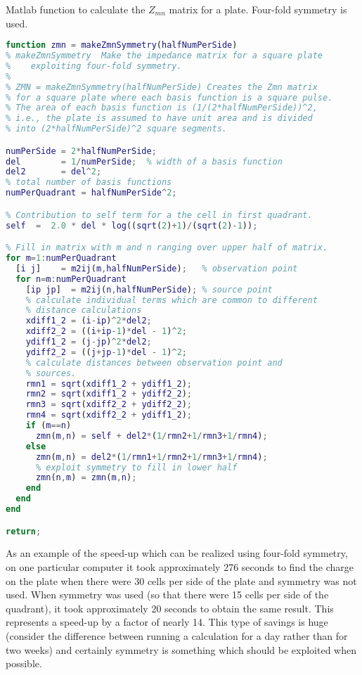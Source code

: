 \begin{program}
Matlab function to calculate the $Z_{mn}$ matrix for a
plate.  Four-fold symmetry is used. \label{pro:zmnSymmetry}
\codemiddle
\begin{lstlisting}[language=Matlab]
function zmn = makeZmnSymmetry(halfNumPerSide)
% makeZmnSymmetry  Make the impedance matrix for a square plate
%    exploiting four-fold symmetry.
%
% ZMN = makeZmnSymmetry(halfNumPerSide) Creates the Zmn matrix
% for a square plate where each basis function is a square pulse.
% The area of each basis function is (1/(2*halfNumPerSide))^2,
% i.e., the plate is assumed to have unit area and is divided
% into (2*halfNumPerSide)^2 square segments.

numPerSide = 2*halfNumPerSide;
del        = 1/numPerSide;  % width of a basis function
del2       = del^2;
% total number of basis functions
numPerQuadrant = halfNumPerSide^2;

% Contribution to self term for a the cell in first quadrant.
self  =  2.0 * del * log((sqrt(2)+1)/(sqrt(2)-1));

% Fill in matrix with m and n ranging over upper half of matrix.
for m=1:numPerQuadrant
  [i j]    = m2ij(m,halfNumPerSide);   % observation point
  for n=m:numPerQuadrant
    [ip jp]  = m2ij(n,halfNumPerSide); % source point
    % calculate individual terms which are common to different
    % distance calculations
    xdiff1_2 = (i-ip)^2*del2;
    xdiff2_2 = ((i+ip-1)*del - 1)^2;
    ydiff1_2 = (j-jp)^2*del2;
    ydiff2_2 = ((j+jp-1)*del - 1)^2;
    % calculate distances between observation point and
    % sources.
    rmn1 = sqrt(xdiff1_2 + ydiff1_2);
    rmn2 = sqrt(xdiff1_2 + ydiff2_2);
    rmn3 = sqrt(xdiff2_2 + ydiff2_2);
    rmn4 = sqrt(xdiff2_2 + ydiff1_2);
    if (m==n)
      zmn(m,n) = self + del2*(1/rmn2+1/rmn3+1/rmn4);
    else
      zmn(m,n) = del2*(1/rmn1+1/rmn2+1/rmn3+1/rmn4);
      % exploit symmetry to fill in lower half
      zmn(n,m) = zmn(m,n);
    end
  end
end

return;
\end{lstlisting}
\end{program}

As an example of the speed-up which can be realized using four-fold
symmetry, on one particular computer it took approximately 276 seconds
to find the charge on the plate when there were 30 cells per side of
the plate and symmetry was not used.  When symmetry was used (so that
there were 15 cells per side of the quadrant), it took approximately
20 seconds to obtain the same result.  This represents a speed-up by a
factor of nearly 14.  This type of savings is huge (consider the
difference between running a calculation for a day rather than for two
weeks) and certainly symmetry is something which should be exploited
when possible.

